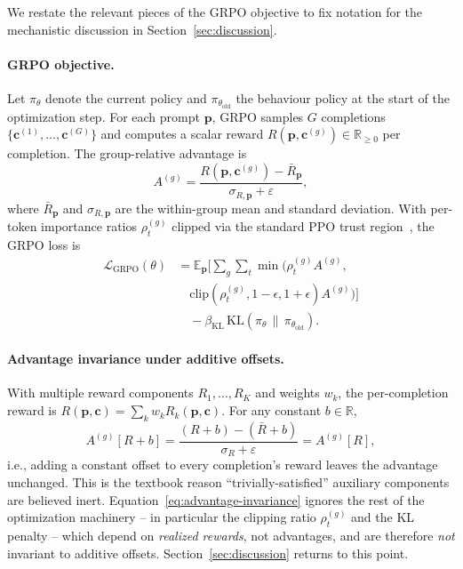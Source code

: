 \documentclass[11pt]{article}
\newcommand{\R}[1]{R_{#1}}
\newcommand{\E}{\mathbb{E}}
\newcommand{\KL}{\mathrm{KL}}
\begin{document}
We restate the relevant pieces of the GRPO objective to fix notation
for the mechanistic discussion in Section~\ref{sec:discussion}.

\paragraph{GRPO objective.}
Let $\pi_\theta$ denote the current policy and
$\pi_{\theta_{\text{old}}}$ the behaviour policy at the start of the
optimization step. For each prompt $\mathbf{p}$, GRPO samples
$G$ completions $\{\mathbf{c}^{(1)},\ldots,\mathbf{c}^{(G)}\}$ and
computes a scalar reward
$R(\mathbf{p},\mathbf{c}^{(g)})\in\mathbb{R}_{\geq 0}$ per completion.
The group-relative advantage is
\begin{equation}
A^{(g)} = \frac{R(\mathbf{p},\mathbf{c}^{(g)}) - \bar{R}_{\mathbf{p}}}%
              {\sigma_{R,\mathbf{p}} + \varepsilon},
\label{eq:advantage}
\end{equation}
where $\bar{R}_{\mathbf{p}}$ and $\sigma_{R,\mathbf{p}}$ are the
within-group mean and standard deviation. With per-token importance
ratios $\rho_t^{(g)}$ clipped via the standard PPO trust
region~\cite{schulman2017ppo}, the GRPO loss is
\begin{align}
\mathcal{L}_{\text{GRPO}}(\theta) &=
\E_{\mathbf{p}}\Big[\sum_g \sum_t \min\!\big(\rho_t^{(g)} A^{(g)}, \nonumber\\
& \quad \mathrm{clip}(\rho_t^{(g)},1{-}\epsilon,1{+}\epsilon) A^{(g)}\big)\Big] \nonumber\\
& \quad - \beta_{\text{KL}}\,\KL(\pi_\theta\,\|\,\pi_{\theta_{\text{old}}}).
\label{eq:grpo}
\end{align}

\paragraph{Advantage invariance under additive offsets.}
With multiple reward components $\R{1},\ldots,\R{K}$ and weights $w_k$,
the per-completion reward is
$R(\mathbf{p},\mathbf{c}) = \sum_k w_k \R{k}(\mathbf{p},\mathbf{c})$.
For any constant $b\in\mathbb{R}$,
\begin{equation}
A^{(g)}\!\left[R + b\right]
= \frac{(R + b) - (\bar{R}+b)}{\sigma_R + \varepsilon}
= A^{(g)}\!\left[R\right],
\label{eq:advantage-invariance}
\end{equation}
i.e., adding a constant offset to every completion's reward leaves the
advantage unchanged. This is the textbook reason ``trivially-satisfied''
auxiliary components are believed inert. Equation~\eqref{eq:advantage-invariance}
ignores the rest of the optimization machinery -- in particular the
clipping ratio $\rho_t^{(g)}$ and the KL penalty -- which depend on
\emph{realized rewards}, not advantages, and are therefore \emph{not}
invariant to additive offsets. Section~\ref{sec:discussion} returns to
this point.
\end{document}
